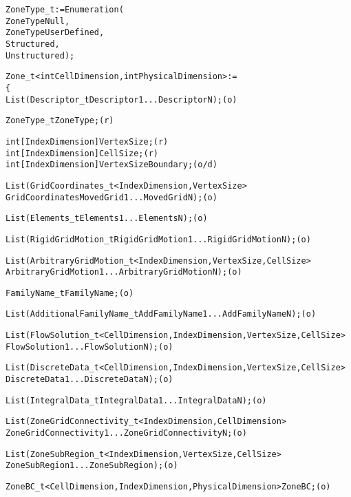 \begin{alltt}	
  ZoneType\_t := Enumeration(
    ZoneTypeNull,
    ZoneTypeUserDefined,
    Structured,
    Unstructured ) ;

  Zone_t< int CellDimension, int PhysicalDimension > :=
    \{
    List( Descriptor_t Descriptor1 ... DescriptorN ) ;                      (o)

    ZoneType_t ZoneType ;                                                   (r)

    int[IndexDimension] VertexSize ;                                        (r)
    int[IndexDimension] CellSize ;                                          (r)
    int[IndexDimension] VertexSizeBoundary ;                                (o/d)

    List( GridCoordinates_t<IndexDimension, VertexSize>
          GridCoordinates MovedGrid1 ... MovedGridN ) ;                     (o)

    List( Elements_t Elements1 ... ElementsN ) ;                            (o)

    List( RigidGridMotion_t RigidGridMotion1 ... RigidGridMotionN ) ;       (o)

    List( ArbitraryGridMotion_t<IndexDimension, VertexSize, CellSize>
          ArbitraryGridMotion1 ... ArbitraryGridMotionN ) ;                 (o)

    FamilyName_t FamilyName ;                                               (o)

    List( AdditionalFamilyName\_t AddFamilyName1 ... AddFamilyNameN ) ;     (o)

    List( FlowSolution_t<CellDimension, IndexDimension, VertexSize, CellSize> 
          FlowSolution1 ... FlowSolutionN ) ;                               (o)

    List( DiscreteData_t<CellDimension, IndexDimension, VertexSize, CellSize> 
          DiscreteData1 ... DiscreteDataN ) ;                               (o)

    List( IntegralData_t IntegralData1 ... IntegralDataN ) ;                (o)

    List( ZoneGridConnectivity_t<IndexDimension, CellDimension>
          ZoneGridConnectivity1 ... ZoneGridConnectivityN ;                 (o)

    List( ZoneSubRegion_t<IndexDimension, VertexSize, CellSize>
          ZoneSubRegion1 ... ZoneSubRegion ) ;                              (o)

    ZoneBC_t<CellDimension, IndexDimension, PhysicalDimension> ZoneBC ;     (o)


\end{alltt}
